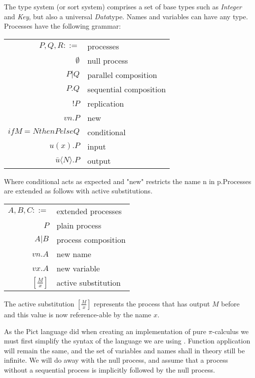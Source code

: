 The type system (or sort system) comprises a set of base types such as \emph{Integer} and \emph{Key}, but also a universal \emph{Data}type. Names and variables can have any type. 
Processes have the following grammar:

\begin{table}[hc!]
    \begin{tabular}{r l}
         $P,Q,R ::=$ & processes  \\
         $\emptyset$& null process\\
        $P|Q$& parallel composition\\
        $P.Q$& sequential composition\\
        $!P$& replication \\
        $vn.P$& new \\
        $if M=N then P else Q $& conditional \\
        $u(x).P$& input \\
        $\bar{u}\langle N \rangle .P$& output \\
    \end{tabular}
\end{table} 
Where conditional acts as expected and "new" restricts the name n in p.Processes are extended as follows with active substitutions.

\begin{table}[hc!]
    \begin{tabular}{r l}
         $A,B,C ::=$ & extended processes  \\
        $P$& plain process\\
        $A|B$& process composition \\
        $vn.A$& new name \\
        $vx.A$& new variable \\
        $\left[ \frac{M}{x} \right]$&  active substitution \\
    \end{tabular}
\end{table} 

The active substitution $\left[ \frac{M}{x} \right]$ represents the process that has output $M$ before and this value is now reference-able by the name $x$.

As the Pict language did when creating an implementation of pure $\pi$-calculus we must first simplify the syntax of the language we are using \cite{pt97}. Function application will remain the same, and the set of variables and names shall in theory still be infinite. We will do away with the null process, and assume that a process without a sequential process is implicitly followed by the null process.


